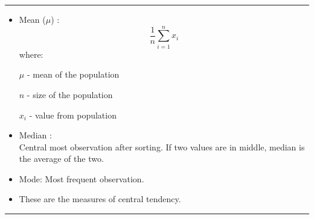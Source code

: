 \documentclass[	DIV=calc,%
paper=a4,%
fontsize=11pt,%
twocolumn]{scrartcl} %
\newcommand{\hformbar}[1]{\vspace{5pt}\hrule\vspace{10pt}} %
\newcommand{\formdesc}[1]{\noindent\textbf{#1}}
\begin{document}
\newpage
\hformbar
\formdesc{Mean, Median and Mode:}

\begin{itemize}
	\item Mean ($\mu$) : $$\frac{1}{n}\sum_{i=1}^{n}x_i$$
	where:
	
		$\mu$ - mean of the population
		
		$n$ - size of the population
		
		$x_i$ - value from population
	\item Median : \\ Central most observation after sorting. If two values are in middle, median is the average of the two.
	\item Mode: Most frequent observation.
	\item These are the measures of central tendency.
\end{itemize}

\hformbar
\formdesc{Variance:}
\end{document}
